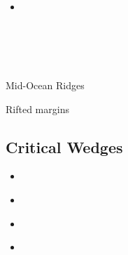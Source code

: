 \begin{scriptsize}
\begin{itemize}
\textcite{hebg21} \\
\textcite{nebg21} \\
\textcite{qill21} \\
\textcite{luhu21} \\
\textcite{gona21} \\
\textcite{manp21} \\
\textcite{jokd21} \\
\textcite{grrm21} \\
\textcite{deol21} \\
\item[\twothousandtwentytwo] 
\textcite{thhu22} \\
\textcite{olgr22} \\
\textcite{ludn22} \\
\textcite{rutb22} \\
\textcite{thhl22} \\
\end{itemize}
\end{scriptsize}


Mid-Ocean Ridges

\textcite{pukm22} 


Rifted margins
\textcite{pihg22} \\



\subsection{Critical Wedges}

\begin{scriptsize}
\begin{itemize}
\item[\nineteenninetyfour] 
\textcite{koon94}\\
\item[\twothousandsix] 
\textcite{rosw06}\\
\item[\twothousandeight] 
\textcite{rowf08}\\
\item[\twothousandthirteen] 
\textcite{cass13}\\
\end{itemize}
\end{scriptsize}

